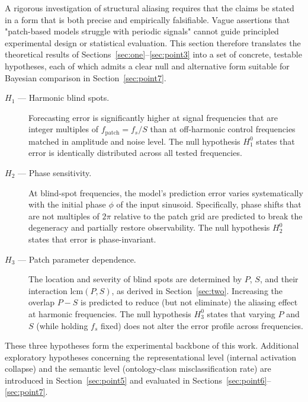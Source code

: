 A rigorous investigation of structural aliasing requires that the claims be stated in a form that is both precise and empirically falsifiable.
Vague assertions that "patch-based models struggle with periodic signals" cannot guide principled experimental design or statistical evaluation.
This section therefore translates the theoretical results of Sections~\ref{sec:one}–\ref{sec:point3} into a set of concrete, testable hypotheses, each of which admits a clear null and alternative form suitable for Bayesian comparison in Section~\ref{sec:point7}.

\begin{description}
    \item[$H_1$ — Harmonic blind spots.]
    Forecasting error is significantly higher at signal frequencies that are integer multiples of $f_{\mathrm{patch}} = f_s / S$ than at off-harmonic control frequencies matched in amplitude and noise level.
    The null hypothesis $H_1^0$ states that error is identically distributed across all tested frequencies.

    \item[$H_2$ — Phase sensitivity.]
    At blind-spot frequencies, the model's prediction error varies systematically with the initial phase $\phi$ of the input sinusoid.
    Specifically, phase shifts that are not multiples of $2\pi$ relative to the patch grid are predicted to break the degeneracy and partially restore observability.
    The null hypothesis $H_2^0$ states that error is phase-invariant.

    \item[$H_3$ — Patch parameter dependence.]
    The location and severity of blind spots are determined by $P$, $S$, and their interaction $\mathrm{lcm}(P,S)$, as derived in Section~\ref{sec:two}.
    Increasing the overlap $P - S$ is predicted to reduce (but not eliminate) the aliasing effect at harmonic frequencies.
    The null hypothesis $H_3^0$ states that varying $P$ and $S$ (while holding $f_s$ fixed) does not alter the error profile across frequencies.
\end{description}

These three hypotheses form the experimental backbone of this work.
Additional exploratory hypotheses concerning the representational level (internal activation collapse) and the semantic level (ontology-class misclassification rate) are introduced in Section~\ref{sec:point5} and evaluated in Sections~\ref{sec:point6}–\ref{sec:point7}.
